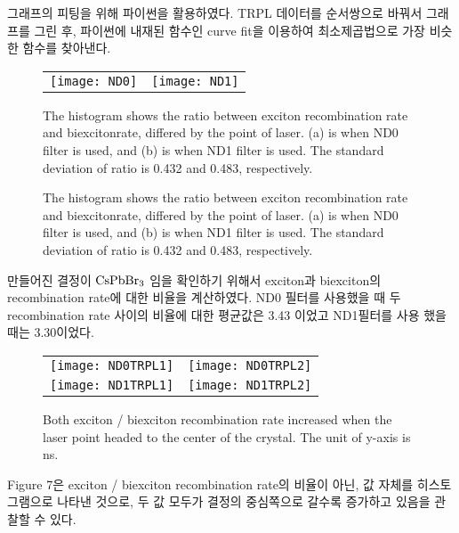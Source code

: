 그래프의 피팅을 위해 파이썬을 활용하였다. TRPL 데이터를 순서쌍으로 바꿔서 그래프를 그린 후, 파이썬에 내재된 함수인 curve fit을 이용하여 최소제곱법으로 가장 비슷한 함수를 찾아낸다.
\begin{figure}[t]
	\begin{center}
		\begin{tabular}{cc}
			\texttt{[image: ND0]} &
			\texttt{[image: ND1]}
		\end{tabular}
		\caption{The histogram shows the ratio between exciton recombination rate and biexcitonrate, differed by the point of laser. (a) is when ND0 filter is used, and (b) is when ND1 filter is used. The standard deviation of ratio is 0.432 and 0.483, respectively. }	
		\label{fig:FIR221}
	\end{center}
\end{figure}

\begin{figure}[t]
	\begin{center}
		\caption{The histogram shows the ratio between exciton recombination rate and biexcitonrate, differed by the point of laser. (a) is when ND0 filter is used, and (b) is when ND1 filter is used. The standard deviation of ratio is 0.432 and 0.483, respectively. }	
		\label{fig:FIR221-1}
	\end{center}
\end{figure}

 만들어진 결정이 $\rm{CsPbBr_3}$ 임을 확인하기 위해서 exciton과 biexciton의 recombination rate에 대한 비율을 계산하였다. 
ND0 필터를 사용했을 때 두 recombination rate 사이의 비율에 대한 평균값은 3.43 이었고 ND1필터를 사용 했을 때는 3.30이었다.
\clearpage
\begin{figure}[h]
	\begin{center}
		\begin{tabular}{cc}
			\texttt{[image: ND0TRPL1]} &
			\texttt{[image: ND0TRPL2]}\\
			\texttt{[image: ND1TRPL1]} &
			\texttt{[image: ND1TRPL2]}
		\end{tabular}
		\caption{Both exciton / biexciton recombination rate increased when the laser point headed to the center of the crystal. The unit of y-axis is ns.}	
		\label{fig:FIR221}
	\end{center}
\end{figure}
Figure 7은 exciton / biexciton recombination rate의 비율이 아닌, 값 자체를 히스토그램으로 나타낸 것으로, 두 값 모두가 결정의 중심쪽으로 갈수록 증가하고 있음을 관찰할 수 있다. 